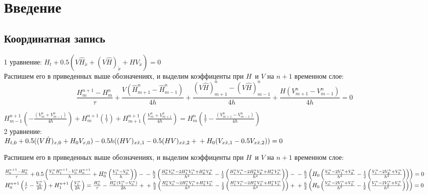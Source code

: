 \section{Введение}
\subsection{Координатная запись}

1 уравнение:
$
H_t + 0.5(V\hat{H}_{\mathring{x}} + (V\hat{H})_{\mathring{x}} + HV_{\mathring{x}}) = 0
$\\
Распишем его в приведенных выше обозначениях, и выделим коэффиценты при $H\,$ и $V$ на $n + 1$ временном слое:
$$
\frac{H^{n+1}_m - H^n_m}{\tau} + \frac{V(\hat{H}_{m+1}^n - \hat{H}_{m-1}^n)}{4h} + \frac{(V\hat{H})^n_{m+1} - (V\hat{H})^n_{m-1}}{4h} + \frac{H(V^n_{m+1} - V^n_{m-1})}{4h} = 0
$$

$
H_{m-1}^{n+1}\left(-\frac{(V_m^n + V_{m-1}^n)}{4h}\right) + H_{m}^{n+1}\left(\frac{1}{\tau}\right) + H_{m+1}^{n+1}\left(\frac{V_m^n + V_{m+1}^n}{4h}\right) = H_m^n\left(\frac{1}{\tau} - \frac{(V_{m+1}^n - V_{m-1}^n)}{4h} \right)
$\\

2 уравнение:\\
$
H_{t,0} + 0.5((V\hat{H})_{x,0} + H_0V_{x,0}) - 0.5h((HV)_{x\bar{x},1} - 0.5(HV)_{x\bar{x},2} + \\
+ H_0(V_{x\bar{x},1} - 0.5 V_{x\bar{x},2})) = 0
$

Распишем его в приведенных выше обозначениях, и выделим коэффиценты при $H\,$ и $V$ на $n + 1$ временном слое:

$
\frac{H_0^{n+1} - H_0^n}{\tau} + 0.5\left(\frac{V_1^{n}H_1^{n+1} - V_0^nH_0^{n+1}}{h} + H_0^n\left(\frac{V_1^n-V_0^n}{h}\right)\right) - \\
- \frac{h}{2}\left(\frac{H_0^nV_0^n-2H_1^nV_1^n + H_2^nV_2^n}{h^2} -\frac{1}{2}\left(\frac{H_1^nV_1^n-2H_2^nV_2^n + H_3^nV_3^n}{h^2}\right)\right) -\\
- \frac{h}{2}\left(H_0\left(\frac{V_0^n-2V_1^n+V_2^n}{h^2} -\frac{1}{2}\left(\frac{V_1^n - 2V_2^n + V_3^n}{h^2}\right)\right)\right) = 0
$\\

$
H_0^{n+1}\left(\frac{1}{\tau} - \frac{V_0^n}{2h}\right) + H_1^{n+1}\left(\frac{V_1^n}{2h}\right) = \frac{H_0^n}{\tau} - \frac{H_0^n(V_1^n-V_0^n)}{2h} + \\
+ \frac{h}{2}\left(\frac{H_0^nV_0^n-2H_1^nV_1^n + H_2^nV_2^n}{h^2} -\frac{1}{2}\left(\frac{H_1^nV_1^n-2H_2^nV_2^n + H_3^nV_3^n}{h^2}\right)\right) +\\
+ \frac{h}{2}\left(H_0\left(\frac{V_0^n-2V_1^n+V_2^n}{h^2} -\frac{1}{2}\left(\frac{V_1^n - 2V_2^n + V_3^n}{h^2}\right)\right)\right) = 0
$\\

